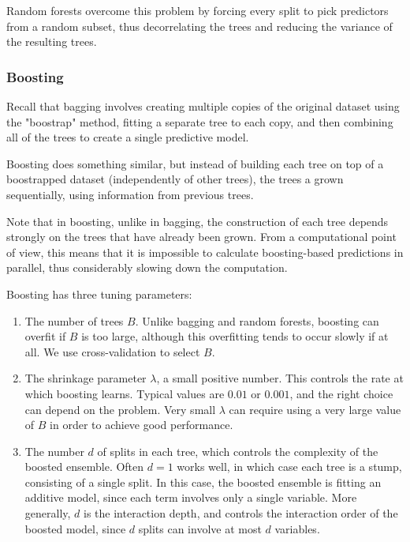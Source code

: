 Random forests overcome this problem by forcing every split to pick predictors from a random subset, thus decorrelating the trees and reducing the variance of the resulting trees.

\subsubsection{Boosting}
Recall that bagging involves creating multiple copies of the original dataset using the "boostrap" method, fitting a separate tree to each copy, and then combining all of the trees to create a single predictive model.

Boosting does something similar, but instead of building each tree on top of a boostrapped dataset (independently of other trees), the trees a grown sequentially, using information from previous trees.

Note that in boosting, unlike in bagging, the construction of each tree depends strongly on the trees that have already been grown. From a computational point of view, this means that it is impossible to calculate boosting-based predictions in parallel, thus considerably slowing down the computation.

Boosting has three tuning parameters:

\begin{enumerate}
    \item The number of trees $B$. Unlike bagging and random forests, boosting can overfit if $B$ is too large, although this overfitting tends to occur slowly if at all. We use cross-validation to select $B$.
    \item The shrinkage parameter $\lambda$, a small positive number. This controls the rate at which boosting learns. Typical values are $0.01$ or $0.001$, and the right choice can depend on the problem. Very small $\lambda$ can require using a very large value of $B$ in order to achieve good performance.
    \item The number $d$ of splits in each tree, which controls the complexity of the boosted ensemble. Often $d=1$ works well, in which case each tree is a stump, consisting of a single split. In this case, the boosted ensemble is fitting an additive model, since each term involves only a single variable. More generally, $d$ is the interaction depth, and controls the interaction order of the boosted model, since $d$ splits can involve at most $d$ variables.
\end{enumerate}
